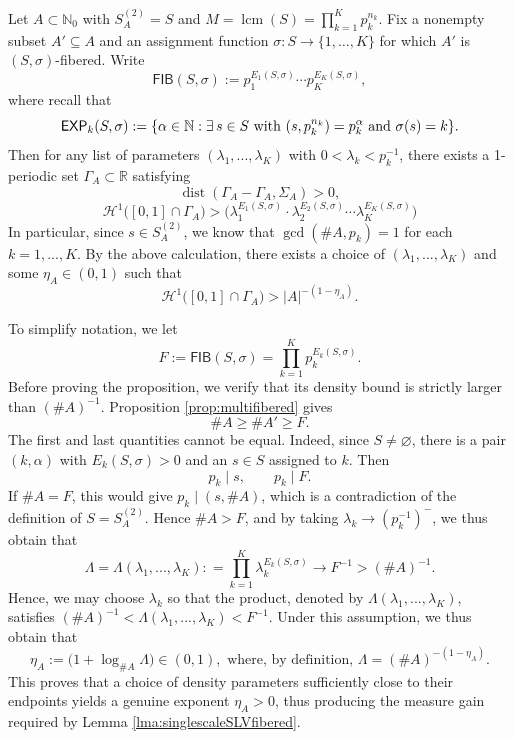 \documentclass[12pt]{amsart}
\numberwithin{equation}{section}
\DeclareMathOperator{\dist}{dist}
\DeclareMathOperator{\lcm}{lcm}
\newcommand{\capexp}{\hbox{\sf EXP}}
\begin{document}
\begin{proposition}\label{prop:singlegammafibered}
Let $A \subset \mathbb{N}_0$ with $S_A^{(2)} = S$ and
$M = \lcm (S) = \prod_{k=1}^K p_k^{n_k}$.  Fix a nonempty subset
$A'\subseteq A$ and an assignment function
$\sigma:S\rightarrow\{1,\ldots,K\}$ for which $A'$ is
$(S,\sigma)$-fibered.  Write
$$
\mathsf{FIB}(S,\sigma) := p_1^{E_1(S,\sigma)} \cdots p_K^{E_K(S,\sigma)},
$$
where recall that
$$
\capexp_k(S, \sigma) : = \{ \alpha\in \mathbb{N} : \exists \, s \in S \textrm{ with } (s, p_k^{n_k}) = p_k^{\alpha} \textrm{ and } \sigma (s) = k \}.
$$
Then for any list of parameters $(\lambda_1,...,\lambda_K)$ with $0 < \lambda_k < p_k^{-1}$, there exists a 1-periodic set $\Gamma_A \subset \mathbb{R}$ satisfying
\begin{equation}\label{eq:distancegammafiber}
\dist(\Gamma_A -\Gamma_A ,\Sigma_A)>0,
\end{equation}
\begin{equation}\label{eq:sizegammafiber}
\mathcal{H}^1 \big([0, 1] \cap \Gamma_A \big) > \bigg( \lambda_{1}^{E_1(S,\sigma)} \cdot \lambda_{2}^{E_2(S,\sigma)} \cdots \lambda_{K}^{E_K(S,\sigma)} \bigg)
\end{equation}
In particular, since $s \in S_A^{(2)}$, we know that $\gcd (\# A, p_k) = 1$ for each $k = 1,...,K$. By the above calculation, there exists a choice of $(\lambda_1,...,\lambda_K)$ and some $\eta_A \in (0,1)$ such that
\begin{equation}\label{ch5:eq:singlescaleta-2}
\mathcal{H}^1 \big([0, 1] \cap \Gamma_A \big) > \lvert A \rvert^{-(1 - \eta_A)}.
\end{equation}
\end{proposition}

To simplify notation, we let
\[
 F:=\mathsf{FIB}(S,\sigma)=\prod_{k=1}^Kp_k^{E_k(S,\sigma)}.
\]
Before proving the proposition, we verify that its density bound is strictly larger than $(\#A)^{-1}$.  Proposition \ref{prop:multifibered} gives
\[
 \#A\geq\#A'\geq F.
\]
The first and last quantities cannot be equal.  Indeed, since $S\neq\varnothing$,
there is a pair $(k,\alpha)$ with $E_k(S,\sigma)>0$ and an $s\in S$ assigned
to $k$.  Then
\[
 p_k\mid s,
 \qquad p_k\mid F.
\]
If $\#A=F$, this would give $p_k\mid(s,\#A)$, which is a contradiction of the definition of
$S=S_A^{(2)}$.  Hence $\# A > F$, and by taking $\lambda_k \rightarrow (p_k^{-1})^-$, we thus obtain that
\[
\Lambda = \Lambda (\lambda_1,...,\lambda_K) : =\prod_{k=1}^K\lambda_k^{E_k(S,\sigma)}\longrightarrow F^{-1}>(\#A)^{-1}.
\]
Hence, we may choose $\lambda_k$ so that the product, denoted by $\Lambda (\lambda_1,...,\lambda_K)$, satisfies
$(\#A)^{-1}<\Lambda(\lambda_1,...,\lambda_K)<F^{-1}$. Under this assumption, we thus obtain that
\[
 \eta_A:= \big(1+\log_{\#A} \Lambda \big)\in(0,1),
 \textrm{ where, by definition, }
 \Lambda=(\#A)^{-(1-\eta_A)}.
\]
This proves that a choice of density parameters sufficiently close to their endpoints yields a genuine exponent $\eta_A>0$, thus producing the measure gain required by Lemma \ref{lma:singlescaleSLVfibered}.
\end{document}
